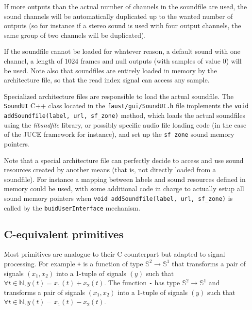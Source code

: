 If more outputs than the actual number of channels in the soundfile are used, the sound channels will be automatically duplicated up to the wanted number of outputs (so for instance if a stereo sound is used with four output channels, the same group of two channels will be duplicated).

If the soundfile cannot be loaded for whatever reason, a default sound with one channel, a length of 1024 frames and null outputs (with samples of value 0) will be used. Note also that soundfiles are entirely loaded in memory by the architecture file, so that the read index signal can access any sample.

Specialized architecture files are responsible to load the actual soundfile. The \lstinline'SoundUI' C++ class located in the \lstinline'faust/gui/SoundUI.h' file implements the \lstinline'void addSoundfile(label, url, sf_zone)' method, which loads the actual soundfiles using the {\it libsndfile} library, or possibly specific audio file loading code (in the case of the JUCE framework for instance), and set up the \lstinline'sf_zone' sound memory pointers. 

Note that a special architecture file can perfectly decide to access and use sound resources created by another means (that is, not directly loaded from a soundfile). For instance a mapping between labels and sound resources defined in memory could be used, with some additional code in charge to actually setup all sound memory pointers when \lstinline'void addSoundfile(label, url, sf_zone)' is called by the \lstinline'buidUserInterface' mechanism.

\subsection{C-equivalent primitives}

Most \faust primitives are analogue to their C counterpart but adapted to signal processing.
For example \lstinline|+| is a function of type $\mathbb{S}^{2}\rightarrow\mathbb{S}^{1}$ that transforms a pair of signals $(x_1,x_2)$ into a 1-tuple of signals $(y)$ such that $\forall t\in\mathbb{N}, y(t)=x_{1}(t)+x_{2}(t)$. The function \lstinline|-| has type $\mathbb{S}^{2}\rightarrow\mathbb{S}^{1}$ and transforms a pair of signals $(x_1,x_2)$ into a 1-tuple of signals $(y)$ such that $\forall t\in\mathbb{N}, y(t)=x_{1}(t)-x_{2}(t)$. 

